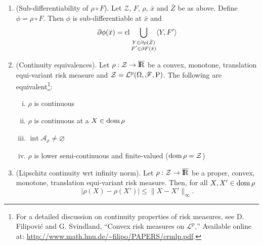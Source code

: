 \documentclass[a4paper,10pt]{article}
\begin{document}
\begin{enumerate}
       $F:\Re^n\to\mathcal{Z}$ be a convex mapping and $\rho:\mathcal{Z}\to\barre$ be a convex monotone 
       risk measure which is finite-valued and continuous at $\bar{Z} = F(\bar{x})$.
       Then, $\phi\dfn \rho\circ F$ is directionally differentiable at $\bar{x}$,
       $\phi'(\bar{x};h)$ is finite-valued for all $h\in\Re^n$ and\footnote{%
       $F$ maps a vector $x$ to random variables, so it is $F(x)(\omega)=f(x,\omega)$. The directional derivative of $f$ with 
       respect to $x$ along a direction $h$ is $f'(\bar{x}; h)$ and it is a random variable. The scalar product here is defined as
       $\<Y, f'(\bar{x}; h)\> = \int_{\Omega} Y(\omega) f'(\bar{x}; h)(\omega) \d \prob(\omega)$.}
       \[
        \phi'(\bar{x}; h) = \sup_{Y \in \partial \rho(\bar{Z})}\<Y, f'(\bar{x}; h)\>
       \]
       
 \item (Sub-differentiability of $\rho\circ F$). Let $\mathcal{Z}$, $F$, $\rho$, $\bar{x}$ and $\bar{Z}$ be as above.
       Define $\phi = \rho\circ F$. 
       Then $\phi$ is sub-differentiable at $\bar{x}$ and 
       \[
        \partial \phi(\bar{x}) = \operatorname{cl} 
        \bigcup_{\substack{Y\in \partial \rho(\bar{Z})\\F'\in \partial F(\bar{x})}}\langle Y, F'\rangle
       \]
       
 \item (Continuity equivalences). Let $\rho:\mathcal{Z}\to\barre$ be a convex, monotone, translation
       equi-variant risk measure and $\mathcal{Z}=\mathcal{L}^p(\Omega,\mathscr{F},\mathrm{P})$. 
       The following are equivalent\footnote{%
       For a detailed discussion on continuity properties of risk measures, see D. Filipovi{\'c} 
       and G. Svindland, ``Convex risk measures on $\mathcal{L}^p$,''
       Available online at: \url{http://www.math.lmu.de/~filipo/PAPERS/crmlp.pdf}.}:
       \begin{enumerate}[i.]
        \item $\rho$ is continuous
        \item $\rho$ is continuous at a $X\in\operatorname{dom} \rho$
        \item $\operatorname{int} \mathcal{A}_\rho \neq \varnothing$
        \item $\rho$ is lower semi-continuous and finite-valued ($\operatorname{dom} \rho = \mathcal{Z}$)
       \end{enumerate}

 
 \item (Lipschitz continuity wrt infinity norm). Let $\rho:\mathcal{Z}\to\barre$ be a proper, 
       convex, monotone, translation equi-variant risk measure. Then, for all $X,X'\in\operatorname{dom}\rho$
       \[
        \left|\rho(X)-\rho(X')\right| \leq \|X-X'\|_{\infty}.
       \]



\end{enumerate}
\end{document}
